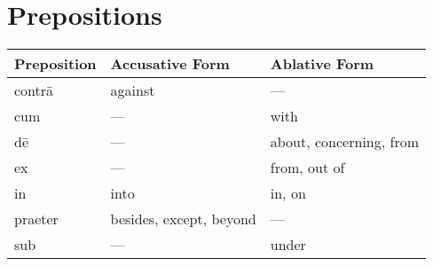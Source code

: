 \section{Prepositions}

\setlength\columnseprule{.4pt}
\renewcommand{\arraystretch}{2.5}

\vspace{3em}
\begin{tabu} to \linewidth{X[l]X[l]X[l]}\toprule
  Preposition & Accusative Form & Ablative Form \\\midrule
  contr\=a & against & --- \\
  cum & --- & with \\
  d\=e & --- & about, concerning, from \\
  ex & --- & from, out of \\
  in & into & in, on \\
  praeter & besides, except, beyond & --- \\
  sub & --- & under \\
\end{tabu}
